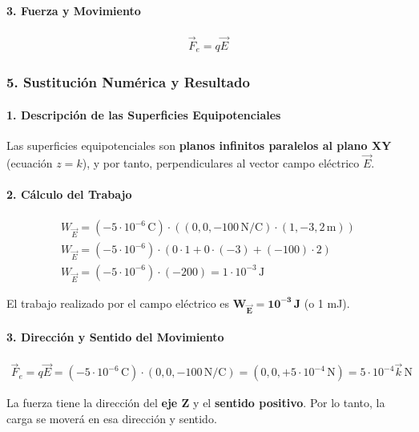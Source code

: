 \paragraph*{3. Fuerza y Movimiento}
\begin{gather}
    \vec{F}_e = q\vec{E}
\end{gather}

\subsubsection*{5. Sustitución Numérica y Resultado}
\paragraph*{1. Descripción de las Superficies Equipotenciales}
\begin{cajaresultado}
    Las superficies equipotenciales son \textbf{planos infinitos paralelos al plano XY} (ecuación $z=k$), y por tanto, perpendiculares al vector campo eléctrico $\vec{E}$.
\end{cajaresultado}

\paragraph*{2. Cálculo del Trabajo}
\begin{gather}
    W_{\vec{E}} = (-5 \cdot 10^{-6} \, \text{C}) \cdot \left( (0, 0, -100 \, \text{N/C}) \cdot (1, -3, 2 \, \text{m}) \right) \nonumber \\[8pt]
    W_{\vec{E}} = (-5 \cdot 10^{-6}) \cdot (0 \cdot 1 + 0 \cdot (-3) + (-100) \cdot 2) \nonumber \\[8pt]
    W_{\vec{E}} = (-5 \cdot 10^{-6}) \cdot (-200) = 1 \cdot 10^{-3} \, \text{J}
\end{gather}
\begin{cajaresultado}
    El trabajo realizado por el campo eléctrico es $\boldsymbol{W_{\vec{E}} = 10^{-3} \, \textbf{J}}$ (o 1 mJ).
\end{cajaresultado}

\paragraph*{3. Dirección y Sentido del Movimiento}
\begin{gather}
    \vec{F}_e = q\vec{E} = (-5 \cdot 10^{-6} \, \text{C}) \cdot (0, 0, -100 \, \text{N/C}) = (0, 0, +5 \cdot 10^{-4} \, \text{N}) = 5 \cdot 10^{-4} \vec{k} \, \text{N}
\end{gather}
\begin{cajaresultado}
    La fuerza tiene la dirección del \textbf{eje Z} y el \textbf{sentido positivo}. Por lo tanto, la carga se moverá en esa dirección y sentido.
\end{cajaresultado}


